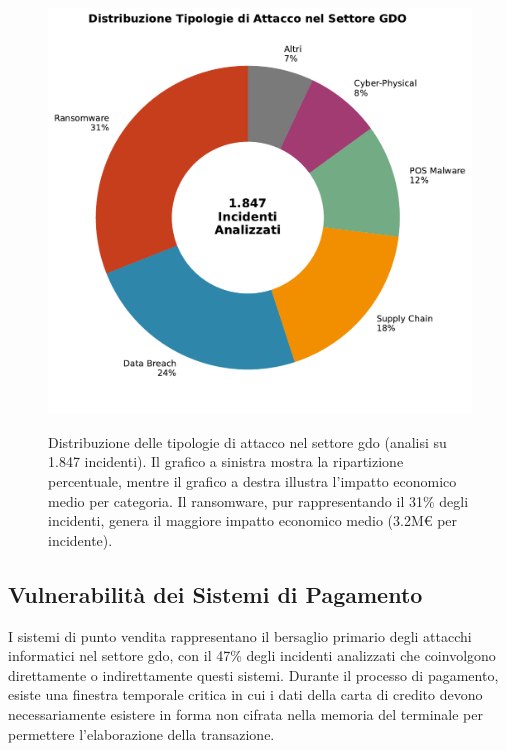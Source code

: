 \begin{figure}[H]
\centering
\includegraphics[width=\textwidth]{thesis_figures/cap2/fig_2_2_attack_types.pdf}
\caption [Distribuzione delle tipologie di attacco nel settore \gls{gdo}]{Distribuzione delle tipologie di attacco nel settore \gls{gdo} (analisi su 1.847 incidenti). Il grafico a sinistra mostra la ripartizione percentuale, mentre il grafico a destra illustra l'impatto economico medio per categoria. Il \gls{ransomware}, pur rappresentando il 31\% degli incidenti, genera il maggiore impatto economico medio (3.2M€ per incidente).}\autocite{CPR2025}
\label{fig:attack_types}
\end{figure}

\subsection{\texorpdfstring{Vulnerabilità dei Sistemi di Pagamento}{2.3.1 - Vulnerabilità dei Sistemi di Pagamento}}

I sistemi di punto vendita rappresentano il bersaglio primario degli attacchi informatici nel settore \gls{gdo}, con il 47\% degli incidenti analizzati che coinvolgono direttamente o indirettamente questi sistemi. Durante il processo di pagamento, esiste una finestra temporale critica in cui i dati della carta di credito devono necessariamente esistere in forma non cifrata nella memoria del terminale per permettere l'elaborazione della transazione.

